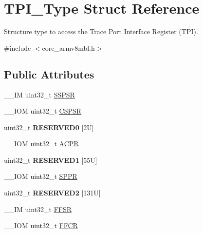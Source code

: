 \hypertarget{struct_t_p_i___type}{}\section{T\+P\+I\+\_\+\+Type Struct Reference}
\label{struct_t_p_i___type}


Structure type to access the Trace Port Interface Register (T\+PI).  




{\ttfamily \#include $<$core\+\_\+armv8mbl.\+h$>$}

\subsection*{Public Attributes}
\begin{DoxyCompactItemize}
\item 
\+\_\+\+\_\+\+IM uint32\+\_\+t \mbox{\hyperlink{struct_t_p_i___type_a037901d7cb870199ac51d9ad0ef9fd1a}{S\+S\+P\+SR}}
\item 
\+\_\+\+\_\+\+I\+OM uint32\+\_\+t \mbox{\hyperlink{struct_t_p_i___type_a8826aa84e5806053395a742d38d59d0f}{C\+S\+P\+SR}}
\item 
\mbox{\label{struct_t_p_i___type_a409fb08ad6d58c17fcb7f59d65db6f93}} 
uint32\+\_\+t {\bfseries R\+E\+S\+E\+R\+V\+E\+D0} \mbox{[}2\+U\mbox{]}
\item 
\+\_\+\+\_\+\+I\+OM uint32\+\_\+t \mbox{\hyperlink{struct_t_p_i___type_a9e5e4421ef9c3d5b7ff8b24abd4e99b3}{A\+C\+PR}}
\item 
\mbox{\label{struct_t_p_i___type_abc2f542560b78ccbbf0a44aadb5651fb}} 
uint32\+\_\+t {\bfseries R\+E\+S\+E\+R\+V\+E\+D1} \mbox{[}55\+U\mbox{]}
\item 
\+\_\+\+\_\+\+I\+OM uint32\+\_\+t \mbox{\hyperlink{struct_t_p_i___type_a12f79d4e3ddc69893ba8bff890d04cc5}{S\+P\+PR}}
\item 
\mbox{\label{struct_t_p_i___type_ae6a238467f129df7440d97de8b58fe03}} 
uint32\+\_\+t {\bfseries R\+E\+S\+E\+R\+V\+E\+D2} \mbox{[}131\+U\mbox{]}
\item 
\+\_\+\+\_\+\+IM uint32\+\_\+t \mbox{\hyperlink{struct_t_p_i___type_a6c47a0b4c7ffc66093ef993d36bb441c}{F\+F\+SR}}
\item 
\+\_\+\+\_\+\+I\+OM uint32\+\_\+t \mbox{\hyperlink{struct_t_p_i___type_a3f68b6e73561b4849ebf953a894df8d2}{F\+F\+CR}}
\item 

\end{DoxyCompactItemize}
